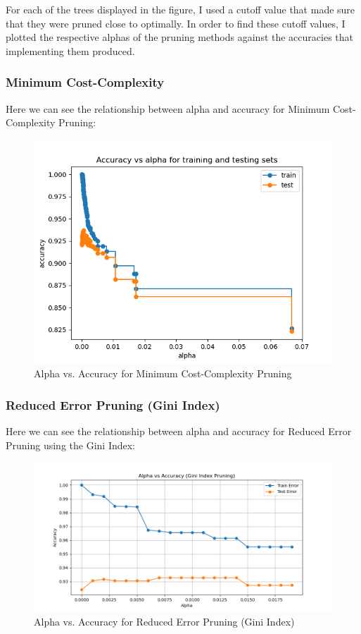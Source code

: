 \documentclass[12pt]{article}
\begin{document}
For each of the trees displayed in the figure, I used a cutoff value that made sure that they were pruned close to optimally. In order to find these cutoff values, I plotted the respective alphas of the pruning methods against the accuracies that implementing them produced.

\subsubsection{Minimum Cost-Complexity}

Here we can see the relationship between alpha and accuracy for Minimum Cost-Complexity Pruning:

\begin{figure}[h!]
    \centering
    \includegraphics[width=0.8\linewidth]{figures/CCP/Accuracy vs alpha for train and test sets.png}
    \caption{Alpha vs. Accuracy for Minimum Cost-Complexity Pruning}
    \label{fig:mcc}
\end{figure}

\subsubsection{Reduced Error Pruning (Gini Index)}

Here we can see the relationship between alpha and accuracy for Reduced Error Pruning using the Gini Index:

\begin{figure}[h!]
    \centering
    \includegraphics[width=0.8\linewidth]{figures/Reduced Error Pruning/gini alpha vs accuracy.png}
    \caption{Alpha vs. Accuracy for Reduced Error Pruning (Gini Index)}
    \label{fig:gini}
\end{figure}
\end{document}
